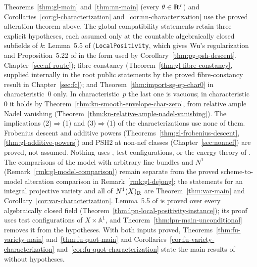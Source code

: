 \begin{remark}\label{rmk:gl-trust-boundary}
Theorems~\ref{thm:gl-main} and~\ref{thm:nn-main} (every $\theta\in\mathbf{R}^r$) and Corollaries~\ref{cor:gl-characterization} and~\ref{cor:nn-characterization}
use the proved alteration theorem above. The global compatibility statements retain three explicit hypotheses, each assumed only at the countable algebraically closed subfields of $k$: Lemma~5.5 of \cite{FHX}
(\texttt{LocalPositivity}, which gives Wu's regularization and Proposition~5.22 of \cite{FHX} in the form used by Corollary~\ref{thm:pg-psh-descent},
Chapter~\ref{sec:nf-route}); fibre constancy (Theorem~\ref{thm:gl-fibre-constancy}, supplied internally in the root public statements by
the proved fibre-constancy result in Chapter~\ref{sec:fc}); and Theorem~\ref{thm:import-sg-ep-char0} in characteristic~$0$ only. In characteristic~$p$
the last one is vacuous; in characteristic~$0$ it holds by Theorem~\ref{thm:kn-smooth-envelope-char-zero}, from relative ample Nadel
vanishing (Theorem~\ref{thm:kn-relative-ample-nadel-vanishing}). The implications (2)$\Rightarrow$(1) and (3)$\Rightarrow$(1) of the characterizations use none of them. Frobenius descent and additive
powers (Theorems~\ref{thm:gl-frobenius-descent}, \ref{thm:gl-additive-powers}) and PSH2 at non-nef classes (Chapter~\ref{sec:nonnef}) are proved, not assumed.
Nothing uses \cite[Theorems~5.6, 6.21, Lemma~4.6, Corollaries~4.17, 12.18]{BJ22}, test configurations, or the energy theory of \cite{BJ22}. The comparisons of
the model with arbitrary line bundles and $N^1$ (Remark~\ref{rmk:gl-model-comparison}) remain separate from the proved scheme-to-model alteration comparison in Remark~\ref{rmk:gl-dejong};
the statements for an integral projective variety and all of $N^1(X)_{\mathbf{R}}$ are Theorem~\ref{thm:var-main} and Corollary~\ref{cor:var-characterization}.
Lemma~5.5 of \cite{FHX} is proved over every algebraically closed field (Theorem~\ref{thm:lpn-local-positivity-instance}); its proof uses test
configurations of $X\times\mathbb A^1$, and Theorem~\ref{thm:lpn-main-unconditional} removes it from the hypotheses.
With both inputs proved, Theorems~\ref{thm:fu-variety-main} and~\ref{thm:fu-quot-main} and Corollaries~\ref{cor:fu-variety-characterization}
and~\ref{cor:fu-quot-characterization} state the main results of \cite{FHX} without hypotheses.
\end{remark}
